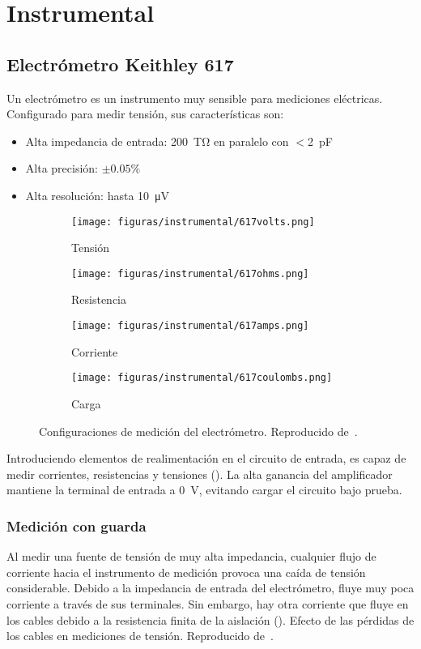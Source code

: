 \section{Instrumental}
\subsection{Electrómetro Keithley 617}
Un electrómetro es un instrumento muy sensible para mediciones eléctricas.
Configurado para medir tensión, sus características son:
\begin{itemize}
    \item Alta impedancia de entrada:
\SI{200}{\tera\ohm} en paralelo con $<$\SI{2}{\pico\farad}
\item Alta precisión: $\pm0.05\%$
\item Alta resolución: hasta \SI{10}{\micro\volt}
\end{itemize}
\begin{figure}[p]
    \begin{subfigure}[b]{\textwidth}
    \centering
        \texttt{[image: figuras/instrumental/617volts.png]}
        \caption{Tensión}
    \end{subfigure}
    \begin{subfigure}[b]{\textwidth}
    \centering
        \texttt{[image: figuras/instrumental/617ohms.png]}
        \caption{Resistencia}
    \end{subfigure}
    \begin{subfigure}[b]{\textwidth}
    \centering
        \texttt{[image: figuras/instrumental/617amps.png]}
        \caption{Corriente}
    \end{subfigure}
    \begin{subfigure}[b]{\textwidth}
    \centering
        \texttt{[image: figuras/instrumental/617coulombs.png]}
        \caption{Carga}
    \end{subfigure}
    \caption{Configuraciones de medición del electrómetro.
    Reproducido de~\cite{keithley_instruments_inc._keithley_1984}.}
    \label{fig:keithley617}
\end{figure}
Introduciendo elementos de realimentación en el circuito de entrada,
es capaz de medir corrientes, resistencias y tensiones 
().
La alta ganancia del amplificador mantiene la terminal de entrada a
\SI{0}{\volt}, 
evitando cargar el circuito bajo prueba.
\subsubsection{Medición con guarda}
Al medir una fuente de tensión de muy alta impedancia,
cualquier flujo de corriente hacia el instrumento de medición
provoca una caída de tensión considerable.
Debido a la impedancia de entrada del electrómetro,
fluye muy poca corriente a través de sus terminales.
Sin embargo, hay otra corriente que fluye en los cables debido a la resistencia
finita de la aislación ().
{Efecto de las pérdidas de los cables en mediciones de tensión.
    Reproducido de~\cite{keithley_instruments_inc._keithley_1984}.}

